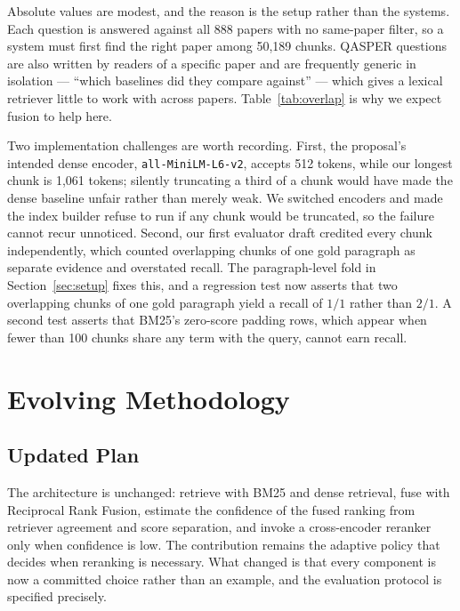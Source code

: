 \documentclass[sigconf,nonacm]{acmart}
\begin{document}
Absolute values are modest, and the reason is the setup rather than the systems.
Each question is answered against all 888 papers with no same-paper filter, so a
system must first find the right paper among 50{,}189 chunks. QASPER questions
are also written by readers of a specific paper and are frequently generic in
isolation --- ``which baselines did they compare against'' --- which gives a
lexical retriever little to work with across papers. Table~\ref{tab:overlap} is
why we expect fusion to help here.

Two implementation challenges are worth recording. First, the proposal's
intended dense encoder, \texttt{all-MiniLM-L6-v2}, accepts 512 tokens, while our
longest chunk is 1{,}061 tokens; silently truncating a third of a chunk would
have made the dense baseline unfair rather than merely weak. We switched encoders
and made the index builder refuse to run if any chunk would be truncated, so the
failure cannot recur unnoticed. Second, our first evaluator draft credited every
chunk independently, which counted overlapping chunks of one gold paragraph as
separate evidence and overstated recall. The paragraph-level fold in
Section~\ref{sec:setup} fixes this, and a regression test now asserts that two
overlapping chunks of one gold paragraph yield a recall of $1/1$ rather than
$2/1$. A second test asserts that BM25's zero-score padding rows, which appear
when fewer than 100 chunks share any term with the query, cannot earn recall.

\section{Evolving Methodology}

\subsection{Updated Plan}

The architecture is unchanged: retrieve with BM25 and dense retrieval, fuse with
Reciprocal Rank Fusion, estimate the confidence of the fused ranking from
retriever agreement and score separation, and invoke a cross-encoder reranker
only when confidence is low. The contribution remains the adaptive policy that
decides when reranking is necessary. What changed is that every component is now
a committed choice rather than an example, and the evaluation protocol is
specified precisely.
\end{document}
